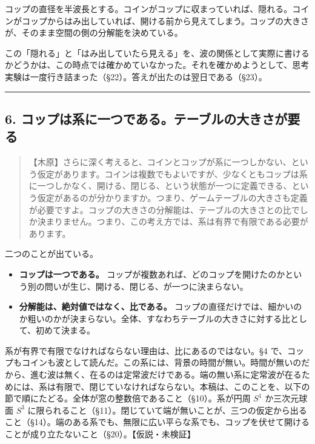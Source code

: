 \documentclass[
  a4paper,
]{ltjsarticle}
\providecommand{\tightlist}{%
  \setlength{\itemsep}{0pt}\setlength{\parskip}{0pt}}
\begin{document}
コップの直径を半波長とする。コインがコップに収まっていれば、隠れる。コインがコップからはみ出していれば、開ける前から見えてしまう。コップの大きさが、そのまま空間の側の分解能を決めている。

この「隠れる」と「はみ出していたら見える」を、波の関係として実際に書けるかどうかは、この時点では確かめていなかった。それを確かめようとして、思考実験は一度行き詰まった（§22）。答えが出たのは翌日である（§23）。

\begin{center}\rule{0.5\linewidth}{0.5pt}\end{center}

\subsection{6.
コップは系に一つである。テーブルの大きさが要る}\label{ux30b3ux30c3ux30d7ux306fux7cfbux306bux4e00ux3064ux3067ux3042ux308bux30c6ux30fcux30d6ux30ebux306eux5927ux304dux3055ux304cux8981ux308b}

\begin{quote}
【木原】さらに深く考えると、コインとコップが系に一つしかない、という仮定があります。コインは複数でもよいですが、少なくともコップは系に一つしかなく、開ける、閉じる、という状態が一つに定義できる、という仮定があるのが分かりますか。つまり、ゲームテーブルの大きさも定義が必要ですよ。コップの大きさの分解能は、テーブルの大きさとの比でしか決まりません。つまり、この考え方では、系は有界で有限である必要があります。
\end{quote}

二つのことが出ている。

\begin{itemize}
\tightlist
\item
  \textbf{コップは一つである。}
  コップが複数あれば、どのコップを開けたのかという別の問いが生じ、開ける、閉じる、が一つに決まらない。
\item
  \textbf{分解能は、絶対値ではなく、比である。}
  コップの直径だけでは、細かいのか粗いのかが決まらない。全体、すなわちテーブルの大きさに対する比として、初めて決まる。
\end{itemize}

系が有界で有限でなければならない理由は、比にあるのではない。§4
で、コップもコインも波として読んだ。この系には、背景の時間が無い。時間が無いのだから、進む波は無く、在るのは定常波だけである。端の無い系に定常波が在るためには、系は有限で、閉じていなければならない。本稿は、このことを、以下の節で順にたどる。全体が窓の整数倍であること（§10）。系が円周
\(S^1\) か三次元球面 \(S^3\)
に限られること（§11）。閉じていて端が無いことが、三つの仮定から出ること（§14）。端のある系でも、無限に広い平らな系でも、コップを伏せて開けることが成り立たないこと（§20）。【仮説・未検証】
\end{document}
